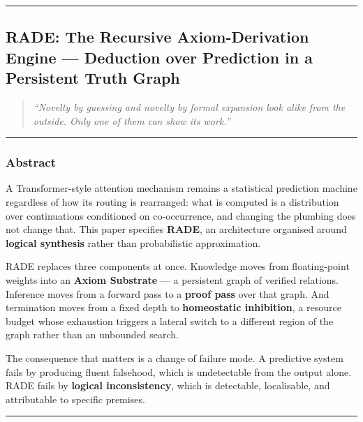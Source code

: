 \documentclass[
  11pt,
  a4paper,
]{article}
\begin{document}
\begin{center}\rule{0.5\linewidth}{0.5pt}\end{center}

\newpage

\subsection{RADE: The Recursive Axiom-Derivation Engine --- Deduction
over Prediction in a Persistent Truth
Graph}\label{rade-the-recursive-axiom-derivation-engine-deduction-over-prediction-in-a-persistent-truth-graph}

\begin{quote}
\emph{``Novelty by guessing and novelty by formal expansion look alike
from the outside. Only one of them can show its work.''}
\end{quote}

\begin{center}\rule{0.5\linewidth}{0.5pt}\end{center}

\subsubsection{Abstract}\label{abstract}

A Transformer-style attention mechanism remains a statistical prediction
machine regardless of how its routing is rearranged: what is computed is
a distribution over continuations conditioned on co-occurrence, and
changing the plumbing does not change that. This paper specifies
\textbf{RADE}, an architecture organised around \textbf{logical
synthesis} rather than probabilistic approximation.

RADE replaces three components at once. Knowledge moves from
floating-point weights into an \textbf{Axiom Substrate} --- a persistent
graph of verified relations. Inference moves from a forward pass to a
\textbf{proof pass} over that graph. And termination moves from a fixed
depth to \textbf{homeostatic inhibition}, a resource budget whose
exhaustion triggers a lateral switch to a different region of the graph
rather than an unbounded search.

The consequence that matters is a change of failure mode. A predictive
system fails by producing fluent falsehood, which is undetectable from
the output alone. RADE fails by \textbf{logical inconsistency}, which is
detectable, localisable, and attributable to specific premises.

\begin{center}\rule{0.5\linewidth}{0.5pt}\end{center}
\end{document}
